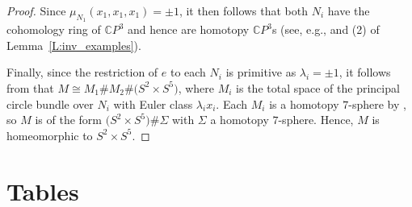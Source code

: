\documentclass[pdftex]{sigma}
\numberwithin{equation}{section}
\theoremstyle{definition}
\numberwithin{table}{section}
\newcommand{\C}{\mathbb{C}}
\begin{document}
\begin{proof}
	Since $\mu_{N_1}(x_1,x_1,x_1)=\pm1$, it then follows that both $N_i$ have the cohomology ring of $\C P^3$ and hence are homotopy $\C P^3$s (see, e.g., \cite[p.\ 41]{Re24b} and (2) of Lemma~\ref{L:inv_examples}).
	
	Finally, since the restriction of $e$ to each $N_i$ is primitive as $\lambda_i=\pm1$, it follows from \cite[Theorems A and B]{GR25} that
$ M\cong M_1\# M_2\# \bigl(S^2\times S^5\bigr)$,
	where $M_i$ is the total space of the principal circle bundle over $N_i$ with Euler class $\lambda_i x_i$. Each $M_i$ is a homotopy $7$-sphere by \cite[Lemma~6]{MY66}, so $M$ is of the form $\bigl(S^2\times S^5\bigr)\#\Sigma$ with $\Sigma $ a homotopy $7$-sphere. Hence, $M$ is homeomorphic to $S^2\times S^5$.
\end{proof}

\appendix

\section{Tables}\label{S:Tables}
\end{document}
